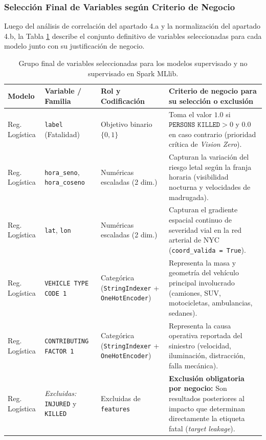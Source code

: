 \subsubsection{Selección Final de Variables según Criterio de Negocio}
\label{subsubsec:num4c_seleccion_negocio}

Luego del análisis de correlación del apartado 4.a y la normalización del apartado 4.b, la Tabla \ref{tab:variables_finales_mllib} describe el conjunto definitivo de variables seleccionadas para cada modelo junto con su justificación de negocio.

\begin{table}[H]
\centering
\scriptsize
\renewcommand{\arraystretch}{1.25}
\caption{Grupo final de variables seleccionadas para los modelos supervisado y no supervisado en Spark MLlib.}
\label{tab:variables_finales_mllib}
\begin{tabularx}{\linewidth}{>{\raggedright\arraybackslash}p{2.2cm} >{\raggedright\arraybackslash}p{3.4cm} >{\raggedright\arraybackslash}p{3.0cm} X}
\toprule
\textbf{Modelo} & \textbf{Variable / Familia} & \textbf{Rol y Codificación} & \textbf{Criterio de negocio para su selección o exclusión} \\
\midrule
Reg. Logística & \texttt{label} (Fatalidad) & Objetivo binario $\{0, 1\}$ & Toma el valor $1.0$ si $\texttt{PERSONS KILLED} > 0$ y $0.0$ en caso contrario (prioridad crítica de \textit{Vision Zero}). \\
Reg. Logística & \texttt{hora\_seno}, \texttt{hora\_coseno} & Numéricas escaladas (2 dim.) & Capturan la variación del riesgo letal según la franja horaria (visibilidad nocturna y velocidades de madrugada). \\
Reg. Logística & \texttt{lat}, \texttt{lon} & Numéricas escaladas (2 dim.) & Capturan el gradiente espacial continuo de severidad vial en la red arterial de NYC (\texttt{coord\_valida = True}). \\
Reg. Logística & \texttt{VEHICLE TYPE CODE 1} & Categórica (\texttt{StringIndexer} + \texttt{OneHotEncoder}) & Representa la masa y geometría del vehículo principal involucrado (camiones, SUV, motocicletas, ambulancias, sedanes). \\
Reg. Logística & \texttt{CONTRIBUTING FACTOR 1} & Categórica (\texttt{StringIndexer} + \texttt{OneHotEncoder}) & Representa la causa operativa reportada del siniestro (velocidad, iluminación, distracción, falla mecánica). \\
Reg. Logística & \textit{Excluidas:} \texttt{INJURED} y \texttt{KILLED} & Excluidas de \texttt{features} & \textbf{Exclusión obligatoria por negocio:} Son resultados posteriores al impacto que determinan directamente la etiqueta fatal (\textit{target leakage}). \\

\end{tabularx}
\end{table}
